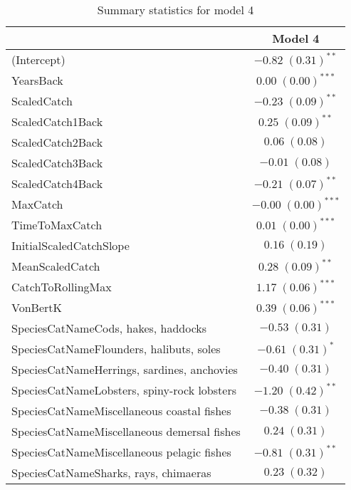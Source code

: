 \documentclass[]{article}
\begin{document}
\begin{table}[h]
\caption{Summary statistics for model 4}
\begin{center}
\begin{tabular}{l c }
\hline
                                            & Model 4 \\
\hline
(Intercept)                                 & $-0.82 \; (0.31)^{**}$  \\
YearsBack                                   & $0.00 \; (0.00)^{***}$  \\
ScaledCatch                                 & $-0.23 \; (0.09)^{**}$  \\
ScaledCatch1Back                            & $0.25 \; (0.09)^{**}$   \\
ScaledCatch2Back                            & $0.06 \; (0.08)$        \\
ScaledCatch3Back                            & $-0.01 \; (0.08)$       \\
ScaledCatch4Back                            & $-0.21 \; (0.07)^{**}$  \\
MaxCatch                                    & $-0.00 \; (0.00)^{***}$ \\
TimeToMaxCatch                              & $0.01 \; (0.00)^{***}$  \\
InitialScaledCatchSlope                     & $0.16 \; (0.19)$        \\
MeanScaledCatch                             & $0.28 \; (0.09)^{**}$   \\
CatchToRollingMax                           & $1.17 \; (0.06)^{***}$  \\
VonBertK                                    & $0.39 \; (0.06)^{***}$  \\
SpeciesCatNameCods, hakes, haddocks         & $-0.53 \; (0.31)$       \\
SpeciesCatNameFlounders, halibuts, soles    & $-0.61 \; (0.31)^{*}$   \\
SpeciesCatNameHerrings, sardines, anchovies & $-0.40 \; (0.31)$       \\
SpeciesCatNameLobsters, spiny-rock lobsters & $-1.20 \; (0.42)^{**}$  \\
SpeciesCatNameMiscellaneous coastal fishes  & $-0.38 \; (0.31)$       \\
SpeciesCatNameMiscellaneous demersal fishes & $0.24 \; (0.31)$        \\
SpeciesCatNameMiscellaneous pelagic fishes  & $-0.81 \; (0.31)^{**}$  \\
SpeciesCatNameSharks, rays, chimaeras       & $0.23 \; (0.32)$        \\

\end{tabular}
\end{center}
\end{table}
\end{document}
